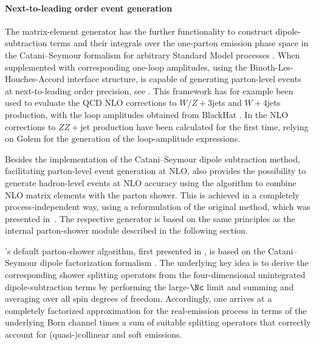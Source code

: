 \paragraph{Next-to-leading order event generation}
\label{Sec:NLO_ME_Sherpa}
The \Amegic matrix-element generator has the further functionality to 
construct dipole-subtraction terms and their integrals over the one-parton 
emission phase space in the Catani--Seymour formalism \cite{Catani:1996vz}
for arbitrary Standard Model processes \cite{Gleisberg:2007md}. 
When supplemented with corresponding one-loop amplitudes, using the 
Binoth-Les-Houches-Accord \cite{Binoth:2010xt} interface structure, \Sherpa 
is capable of generating parton-level events at next-to-leading order
precision, see . This framework
has for example been used to evaluate the QCD NLO corrections to $W/Z+3$jets
\cite{Berger:2009zg,Berger:2009ep,Berger:2010vm} and $W+4$jets 
\cite{Berger:2010zx} production, with the loop amplitudes obtained from 
{\sc BlackHat} \cite{Berger:2008sj}. In \cite{Binoth:2009wk} 
the NLO corrections to $ZZ+$jet production have been calculated for the 
first time, relying on {\sc Golem} \cite{Binoth:2005ff} for the 
generation of the loop-amplitude expressions. 

Besides the implementation of the Catani--Seymour dipole subtraction 
method, facilitating parton-level event generation at NLO, \Sherpa also 
provides the possibility to generate hadron-level events at NLO accuracy 
using the \POWHEG algorithm to combine NLO matrix elements with the \Sherpa 
parton shower. This is achieved in a completely process-independent way, 
using a reformulation of the original \POWHEG method, which was presented 
in~\cite{Hoeche:2010pf}. The respective \POWHEG generator is based 
on the same principles as the internal parton-shower module described in 
the following section.

\mcsubsection{\gensectionshower}
\label{Sec:shower_sherpa}
\Sherpa's default parton-shower algorithm, first presented in 
\cite{Schumann:2007mg}, is based on the Catani--Seymour 
dipole factorization formalism \cite{Catani:1996vz,Catani:2002hc}.
The underlying key idea is to derive the corresponding shower splitting 
operators from the four-dimensional unintegrated dipole-subtraction terms 
by performing the large-$\Nc$ limit and summing and averaging over all 
spin degrees of freedom. Accordingly, one arrives at a completely factorized 
approximation for the real-emission process in terms of the underlying Born 
channel times a sum of suitable splitting operators that correctly account
for (quasi-)collinear and soft emissions. 

